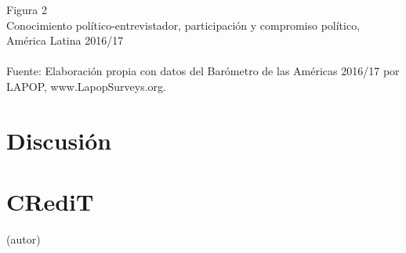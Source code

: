 \documentclass[a4paper]{tufte-handout}
\begin{document}
\begin{figure*}[h!]
\captionsetup[subfigure]{labelformat=empty}
  \centering
  \smallskip\noindent\small Figura 2 \\ Conocimiento político-entrevistador, participación y compromiso político, América Latina 2016/17
  \\
  \\ \smallskip\noindent\scriptsize Fuente: Elaboración propia con datos del Barómetro de las Américas 2016/17 por LAPOP, www.LapopSurveys.org.
\end{figure*}

\section[Discusi\'on] {{\normalfont Discusi\'on}}


\section{{\normalfont CRediT}}

{ (autor)}
\end{document}
